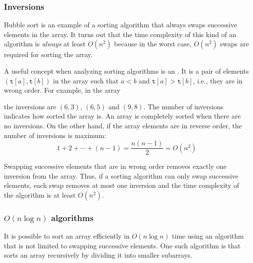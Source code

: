 \subsubsection{Inversions}


Bubble sort is an example of a sorting
algorithm that always swaps successive
elements in the array.
It turns out that the time complexity
of this kind of an algorithm is \emph{always}
at least $O(n^2)$ because in the worst case,
$O(n^2)$ swaps are required for sorting the array.

A useful concept when analyzing sorting
algorithms is an .
It is a pair of elements
$(\texttt{t}[a],\texttt{t}[b])$
in the array such that
$a<b$ and $\texttt{t}[a]>\texttt{t}[b]$,
i.e., they are in wrong order.
For example, in the array
\begin{center}
\end{center}
the inversions are $(6,3)$, $(6,5)$ and $(9,8)$.
The number of inversions indicates
how sorted the array is.
An array is completely sorted when
there are no inversions.
On the other hand, if the array elements
are in reverse order,
the number of inversions is maximum:
\[1+2+\cdots+(n-1)=\frac{n(n-1)}{2} = O(n^2)\]

Swapping successive elements that are
in wrong order removes exactly one inversion
from the array.
Thus, if a sorting algorithm can only
swap successive elements, each swap removes
at most one inversion and the time complexity
of the algorithm is at least $O(n^2)$.

\subsubsection{$O(n \log n)$ algorithms}


It is possible to sort an array efficiently
in $O(n \log n)$ time using an algorithm
that is not limited to swapping successive elements.
One such algorithm is 
that sorts an array recursively by dividing
it into smaller subarrays.

